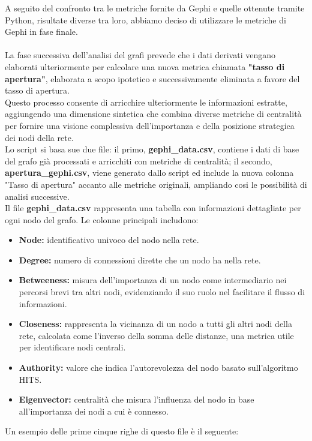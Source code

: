\documentclass[12pt]{article}
\begin{document}
	A seguito del confronto tra le metriche fornite da Gephi e quelle ottenute tramite Python, risultate diverse tra loro, abbiamo deciso di utilizzare le metriche di Gephi in fase finale.\\
	\\
	La fase successiva dell'analisi del grafi prevede che i dati derivati vengano elaborati ulteriormente per calcolare una nuova metrica chiamata \textbf{"tasso di apertura"}, elaborata a scopo ipotetico e successivamente eliminata a favore del tasso di apertura.\\
	Questo processo consente di arricchire ulteriormente le informazioni estratte, aggiungendo una dimensione sintetica che combina diverse metriche di centralità per fornire una visione complessiva dell'importanza e della posizione strategica dei nodi della rete.\\
	Lo script si basa sue due file: il primo, \textbf{gephi\_data.csv}, contiene i dati di base del grafo già processati e arricchiti con metriche di centralità; il secondo, \textbf{apertura\_gephi.csv}, viene generato dallo script ed include la nuova colonna "Tasso di apertura" accanto alle metriche originali, ampliando cosi le possibilità di analisi successive.\\
	Il file \textbf{gephi\_data.csv} rappresenta una tabella con informazioni dettagliate per ogni nodo del grafo. Le colonne principali includono:
	\begin{itemize}[label=] 
		\item \textbf{Node:} identificativo univoco del nodo nella rete.
		\item \textbf{Degree:} numero di connessioni dirette che un nodo ha nella rete.
		\item \textbf{Betweeness:} misura dell'importanza di un nodo come intermediario nei percorsi brevi tra altri nodi, evidenziando il suo ruolo nel facilitare il flusso di informazioni.
		\item \textbf{Closeness:} rappresenta la vicinanza di un nodo a tutti gli altri nodi della rete, calcolata come l'inverso della somma delle distanze, una metrica utile per identificare nodi centrali.
		\item \textbf{Authority:} valore che indica l'autorevolezza del nodo basato sull'algoritmo HITS.
		\item \textbf{Eigenvector:} centralità che misura l'influenza del nodo in base all'importanza dei nodi a cui è connesso.
	\end{itemize}
	Un esempio delle prime cinque righe di questo file è il seguente:
\end{document}
